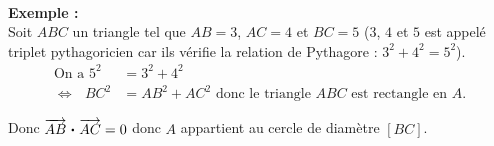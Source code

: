 \documentclass[11pt,a4paper]{article}
\newcommand{\pdt}{\mathbin{\vcenter{\hbox{\scalebox{0.6}{\textbullet}}}}}
\begin{document}
\text{ } ~\\ 

\textbf{Exemple :} ~\\
Soit $ABC$ un triangle tel que $AB=3$, $AC=4$ et $BC=5$ ($3$, $4$ et $5$ est appelé triplet pythagoricien car ils vérifie la relation de Pythagore : $3^2+4^2=5^2$). \\
\vspace{-8pt}
\begin{align*}
    \text{On a } 5^2  & = 3^2+4^2 \\
    \Leftrightarrow \text{ } BC^2 & = AB^2+AC^2 \text{ donc le triangle } ABC \text{ est rectangle en } A \text{.}
\end{align*}

Donc $\overrightarrow{AB}\pdt\overrightarrow{AC}=0$ donc $A$ appartient au cercle de diamètre $[BC]$.
\end{document}
